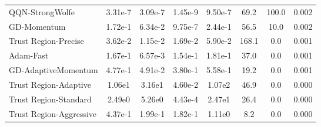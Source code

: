 \documentclass{article}
\begin{document}
\begin{table}[htbp]
{\begin{tabular}{p{2.5cm}*{7}{c}}
QQN-StrongWolfe & 3.31e-7 & 3.09e-7 & 1.45e-9 & 9.50e-7 & 69.2 & 100.0 & 0.002 \\
GD-Momentum & 1.72e-1 & 6.34e-2 & 9.75e-7 & 2.44e-1 & 56.5 & 10.0 & 0.002 \\
Trust Region-Precise & 3.62e-2 & 1.15e-2 & 1.69e-2 & 5.90e-2 & 168.1 & 0.0 & 0.001 \\
Adam-Fast & 1.67e-1 & 6.57e-3 & 1.54e-1 & 1.81e-1 & 37.0 & 0.0 & 0.001 \\
GD-AdaptiveMomentum & 4.77e-1 & 4.91e-2 & 3.80e-1 & 5.58e-1 & 19.2 & 0.0 & 0.001 \\
Trust Region-Adaptive & 1.06e1 & 3.16e1 & 4.60e-2 & 1.07e2 & 46.9 & 0.0 & 0.000 \\
Trust Region-Standard & 2.49e0 & 5.26e0 & 4.43e-4 & 2.47e1 & 26.4 & 0.0 & 0.000 \\
Trust Region-Aggressive & 4.37e-1 & 1.99e-1 & 1.82e-1 & 1.11e0 & 8.2 & 0.0 & 0.000 \\
\bottomrule
\end{tabular}
}
\end{table}
\end{document}
